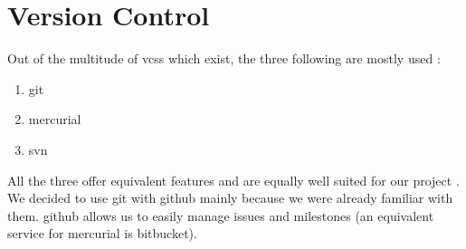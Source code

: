 \section{Version Control}
Out of the multitude of \glspl{vcs} which exist, the three following are mostly used \cite{rhodecodeVCS}:
\begin{enumerate}
\item \gls{git}
\item \gls{mercurial}
\item \gls{svn}
\end{enumerate}
All the three offer equivalent features and are equally well suited for our project \cite{thomson2008relax}. We decided to use \gls{git} with \gls{github} mainly because we were already familiar with them. \Gls{github} allows us to easily manage issues and milestones (an equivalent service for mercurial is \gls{bitbucket}).